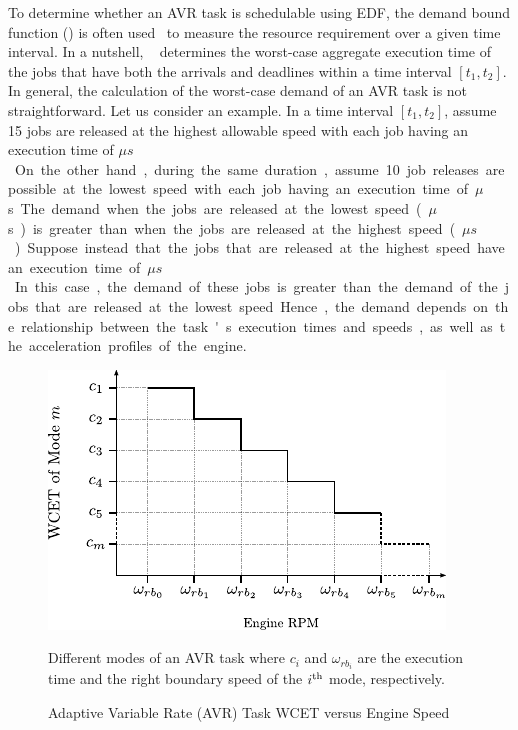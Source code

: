 To determine whether an AVR task is schedulable using EDF, the demand bound function (\dbf) is often used~\cite{biondi_response-time_2015,biondi_feasibility_2015} to measure the resource requirement over a given time interval. In a nutshell, \dbf~ determines the worst-case aggregate execution time of the jobs that have both the arrivals and deadlines within a time interval $[t_1,t_2]$.
In general, the calculation of the worst-case demand of an AVR task is not straightforward.
Let us consider an example.
In a time interval $[t_1,t_2]$, assume 15 jobs are released at the highest allowable speed with each job having an execution time of \unit[50]{$\mu s$}.
On the other hand, during the same duration, assume 10 job releases are possible at the lowest speed with each job having an execution time of \unit[100]{$\mu$s}.
The demand when the jobs are released at the lowest speed (\unit[1,000]{$\mu$s}) is greater than when the jobs are released at the highest speed (\unit[750]{$\mu s$}).
Suppose instead that the jobs that are released at the highest speed have an execution time of \unit[70]{$\mu s$}.
In this case, the demand of these jobs is greater than the demand of the jobs that are released at the lowest speed. 
Hence, the demand depends on the relationship between the task's execution times and speeds, as well as the acceleration profiles of the engine.  

\begin{figure}
\centering
\includegraphics[scale=2.0]{fig/wcetVsRPM.pdf}
\caption{Adaptive Variable Rate (AVR) Task WCET versus Engine Speed}Different modes of an AVR task where $c_i$ and $\omega_{rb_i}$ are the execution time and the right boundary speed of the $i^{\rm th}$ mode, respectively.
\label{fig:AVRImage}
\end{figure}

